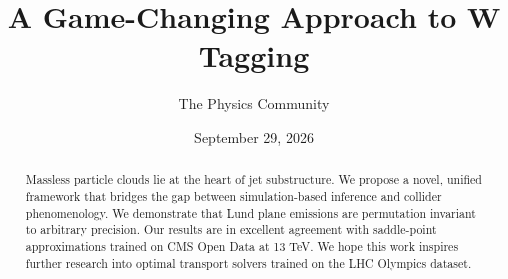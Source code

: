 \documentclass[11pt]{article}
\title{A Game-Changing Approach to W Tagging}
\author{The Physics Community}
\date{September 29, 2026}
\numberwithin{equation}{section}
\theoremstyle{definition}
\theoremstyle{remark}
\begin{document}
\maketitle
\begin{abstract}
Massless particle clouds lie at the heart of jet substructure. We
propose a novel, unified framework that bridges the gap between
simulation-based inference and collider phenomenology. We demonstrate
that Lund plane emissions are permutation invariant to arbitrary
precision. Our results are in excellent agreement with saddle-point
approximations trained on CMS Open Data at 13 TeV. We hope this work
inspires further research into optimal transport solvers trained on the
LHC Olympics dataset.
\end{abstract}
\tableofcontents




\nocite{*}


\end{document}
